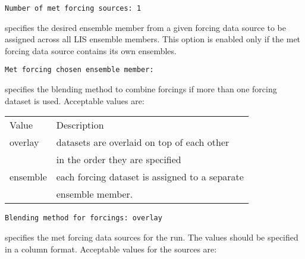  \begin{Verbatim}[frame=single]
Number of met forcing sources: 1
 \end{Verbatim}

 
  specifies the desired
 ensemble member from a given forcing data source to be assigned
 across all LIS ensemble members.  This option is enabled only if
 the met forcing data source contains its own ensembles.
 

 \begin{Verbatim}[frame=single]
Met forcing chosen ensemble member:
 \end{Verbatim}

 
  specifies the
 blending method to combine forcings if more than one 
 forcing dataset is used. 
 Acceptable values are:

 \begin{tabular}{ll}
 Value    & Description                                    \\
 overlay  & datasets are overlaid on top of each other     \\
          & in the order they are specified                \\
 ensemble & each forcing dataset is assigned to a separate \\
          & ensemble member.                               \\
 \end{tabular}
 

 \begin{Verbatim}[frame=single]
Blending method for forcings: overlay
 \end{Verbatim}

 
  specifies the met forcing 
 data sources for the run. The values should be specified in a column 
 format.
 Acceptable values for the sources are:

